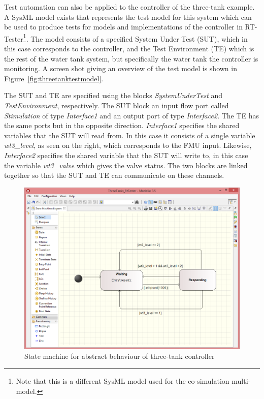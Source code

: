 Test automation can also be applied to the controller of the three-tank example. A SysML model exists that
represents the test model for this system which can be used to produce tests for models and implementations of the
controller in RT-Tester\footnote{Note that this is a different SysML model used for the co-simulation multi-model.}. The model consists of a specified System Under Test (SUT), which in this case corresponds to
the controller, and the Test Environment (TE) which is the rest of the water tank system, but specifically the water
tank the controller is monitoring. A screen shot giving an overview of the test model is shown in
Figure~\ref{fig:threetanktestmodel}.

The  SUT and TE are specified using the blocks \emph{SystemUnderTest} and \emph{TestEnvironment}, respectively. The SUT
block an input flow port called \emph{Stimulation} of type \emph{Interface1} and an output port of type
\emph{Interface2}. The TE has the same ports but in the opposite direction. \emph{Interface1} specifies the shared
variables that the SUT will read from. In this case it consists of a single variable \emph{wt3\_level}, as seen on the
right, which corresponds to the FMU input. Likewise, \emph{Interface2} specifies the shared variable that the SUT will
write to, in this case the variable \emph{wt3\_valve} which gives the valve status. The two blocks are linked together
so that the SUT and TE can communicate on these channels.

\begin{figure}
\begin{center}  
\includegraphics[width=\textwidth]{threetank/ta_state_machine}
\caption{State machine for abstract behaviour of three-tank controller}
\label{fig:threetankstatemachine}
\end{center}
\end{figure}

